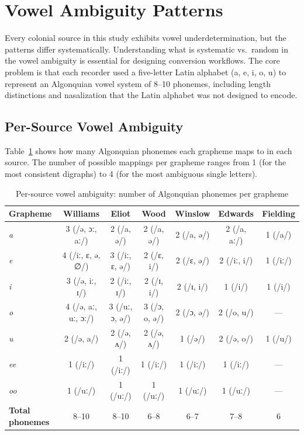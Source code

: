
\section{Vowel Ambiguity Patterns}
\label{sec:vowel-ambiguity}

Every colonial source in this study exhibits vowel underdetermination, but the
patterns differ systematically. Understanding what is systematic vs.\ random
in the vowel ambiguity is essential for designing conversion workflows. The
core problem is that each recorder used a five-letter Latin alphabet (a, e, i,
o, u) to represent an Algonquian vowel system of 8--10 phonemes, including
length distinctions and nasalization that the Latin alphabet was not designed
to encode.

\subsection{Per-Source Vowel Ambiguity}

Table~\ref{tab:vowel-ambiguity} shows how many Algonquian phonemes each
grapheme maps to in each source. The number of possible mappings per
grapheme ranges from 1 (for the most consistent digraphs) to 4 (for the
most ambiguous single letters).

\begin{table}[h]
\centering
\caption{Per-source vowel ambiguity: number of Algonquian phonemes per grapheme}
\label{tab:vowel-ambiguity}
\small
\begin{tabular}{lcccccc}
\toprule
\textbf{Grapheme} & \textbf{Williams} & \textbf{Eliot} & \textbf{Wood} & \textbf{Winslow} & \textbf{Edwards} & \textbf{Fielding} \\
\midrule
\textit{a} & 3 (/ə, ɔː, aː/) & 2 (/a, ə/) & 2 (/a, ə/) & 2 (/a, ə/) & 2 (/a, aː/) & 1 (/a/) \\
\textit{e} & 4 (/iː, ɛ, ə, ∅/) & 3 (/iː, ɛ, ə/) & 2 (/ɛ, i/) & 2 (/ɛ, ə/) & 2 (/iː, i/) & 1 (/iː/) \\
\textit{i} & 3 (/ə, iː, ɪ/) & 2 (/iː, ɪ/) & 2 (/ɪ, i/) & 2 (/ɪ, i/) & 1 (/i/) & 1 (/i/) \\
\textit{o} & 4 (/ə, aː, uː, ɔː/) & 3 (/uː, ɔ, ə/) & 3 (/ɔ, o, ə/) & 2 (/ɔ, ə/) & 2 (/o, u/) & --- \\
\textit{u} & 2 (/ə, a/) & 2 (/ə, ʌ/) & 2 (/ə, ʌ/) & 1 (/ə/) & 2 (/ə, o/) & 1 (/u/) \\
\textit{ee} & 1 (/iː/) & 1 (/iː/) & 1 (/iː/) & 1 (/iː/) & 1 (/iː/) & --- \\
\textit{oo} & 1 (/uː/) & 1 (/uː/) & 1 (/uː/) & 1 (/uː/) & 1 (/uː/) & --- \\
\midrule
\textbf{Total phonemes} & 8--10 & 8--10 & 6--8 & 6--7 & 7--8 & 6 \\
\bottomrule
\end{tabular}
\end{table}

